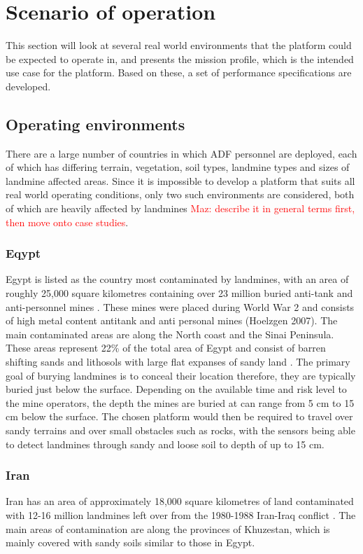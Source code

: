 \documentclass[main.tex]{subfiles}
\begin{document}
\section{Scenario of operation}
This section will look at several real world environments that the platform could be expected to operate in, and presents the mission profile, which is the intended use case for the platform. Based on these, a set of performance specifications are developed.  

\subsection{Operating environments}
There are a large number of countries in which ADF personnel are deployed, each of which has differing terrain, vegetation, soil types, landmine types and sizes of landmine affected areas. Since it is impossible to develop a platform that suits all real world operating conditions, only two such environments are considered, both of which are heavily affected by landmines \parencite{AustralianGovernment2016} \textcolor{red}{Maz: describe it in general terms first, then move onto case studies}. 

\subsubsection{Eqypt}
Egypt is listed as the country most contaminated by landmines, with an area of roughly 25,000 square kilometres containing over 23 million buried anti-tank and anti-personnel mines \parencite{Rushfan2008}. These mines were placed during World War 2 and consists of high metal content antitank and anti personal mines (Hoelzgen 2007). The main contaminated areas are along the North coast and the Sinai Peninsula. These areas represent 22\% of the total area of Egypt and consist of barren shifting sands and lithosols with large flat expanses of sandy land \parencite{Nahrawy2011}. The primary goal of burying landmines is to conceal their location therefore, they are typically buried just below the surface. Depending on the available time and risk level to the mine operators, the depth the mines are buried at can range from 5 cm to 15 cm below the surface. The chosen platform would then be required to travel over sandy terrains and over small obstacles such as rocks, with the sensors being able to detect landmines through sandy and loose soil to depth of up to 15 cm. 
 \subsubsection{Iran}
Iran has an area of approximately 18,000 square kilometres of land contaminated with 12-16 million landmines left over from the 1980-1988 Iran-Iraq conflict \parencite{landmineMonitor2015}. The main areas of contamination are along the provinces of Khuzestan, which is mainly covered with sandy soils similar to those in Egypt. 
\end{document}
